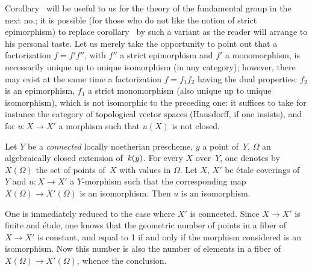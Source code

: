 Corollary~ will be useful to us for the theory of the
fundamental group in the next no.; it is possible (for those
who do not like the notion of strict epimorphism) to replace
corollary~ by such a variant as the reader will arrange
to his personal taste. Let us merely take the opportunity to
point out that a factorization
$f=f'f''$, with $f''$ a strict epimorphism and $f'$ a
monomorphism, is necessarily unique up to unique isomorphism
(in any category); however, there may exist at the
same time a factorization $f=f_1f_2$ having the
dual properties: $f_2$ is an epimorphism, $f_1$ a
strict monomorphism (also unique up to unique
isomorphism), which is not isomorphic to the preceding one: it
suffices to take for instance the category of topological vector spaces
(Hausdorff, if one insists), and for $u \colon X \to
X'$ a morphism such that $u(X)$ is not closed.

\begin{proposition}
\label{V.3.7} Let $Y$ be a \emph{connected} locally
noetherian prescheme, $y$ a point of~$Y$, $\mathit{\Omega}$ an
algebraically closed extension
of~$\mathit{k}(y)$. For every $X$ over~$Y$, one
denotes by $X(\Omega)$ the set of points of~$X$
with values in $\Omega$. Let $X$, $X'$ be \'etale coverings
of~$Y$ and $u \colon X \to X'$ a $Y$-morphism such that
the corresponding map $X(\Omega) \to
X'(\Omega)$ is an isomorphism. Then $u$ is an
isomorphism.
\end{proposition}

One is immediately reduced to the case where $X'$ is
connected. Since $X \to X'$ is finite and \'etale, one knows that the
geometric number of points in a fiber of~$X \to X'$ is
constant, and equal to 1 if and only if the morphism
considered is an isomorphism. Now this number is also the
number of elements in a fiber of~$X(\Omega) \to
X'(\Omega)$, whence the conclusion.
